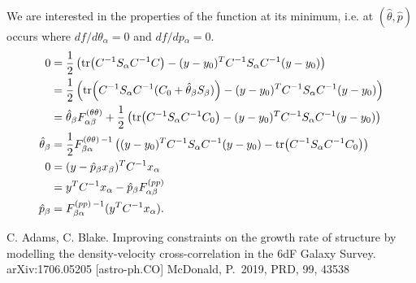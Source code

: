 \documentclass{article}
\begin{document}
We are interested in the properties of the function at its minimum, i.e. at $(\hat{\theta},\hat{p})$ occurs where $df/d\theta_\alpha=0 $ and $df/dp{_\alpha}=0$.
\begin{align}
0 & = \frac{1}{2}\left(\tr(C^{-1}S_\alpha C^{-1} C)  - (y-y_0)^T  C^{-1} S_{\alpha} C^{-1}  (y-y_0)\right) \\
& = \frac{1}{2}\left(\tr(C^{-1}S_\alpha C^{-1} (C_0 + \hat{\theta}_\beta S_\beta) )  - (y-y_0)^T  C^{-1} S_{\alpha} C^{-1}  (y-y_0)\right) \\
& =\hat{ \theta}_\beta F^{(\theta \theta)}_{\alpha \beta} +  \frac{1}{2}\left(\tr(C^{-1}S_\alpha C^{-1} C_0)  - (y-y_0)^T  C^{-1} S_{\alpha} C^{-1}  (y-y_0)\right) \\
\hat{ \theta}_\beta  & =  \frac{1}{2} F^{(\theta \theta)\, -1}_{\beta \alpha} \left( (y-y_0)^T  C^{-1} S_{\alpha} C^{-1}  (y-y_0) - \tr(C^{-1}S_\alpha C^{-1} C_0) \right) \\
0 &=  (y-\hat{p}_\beta x_\beta )^T C^{-1} x_\alpha \\
& = y^TC^{-1} x_\alpha - \hat{p}_\beta F^{(pp)}_{\alpha \beta} \\
 \hat{p}_\beta  & =   F^{(pp)\,-1}_{\beta \alpha} (y^TC^{-1} x_\alpha ).
\end{align}


\begin{thebibliography}{9}
C. Adams, C. Blake. 
Improving constraints on the growth rate of structure by modelling the density-velocity cross-correlation in the 6dF Galaxy Survey. arXiv:1706.05205 [astro-ph.CO]
 McDonald, P.\ 2019, PRD, 99, 43538
\end{thebibliography}
\end{document}
